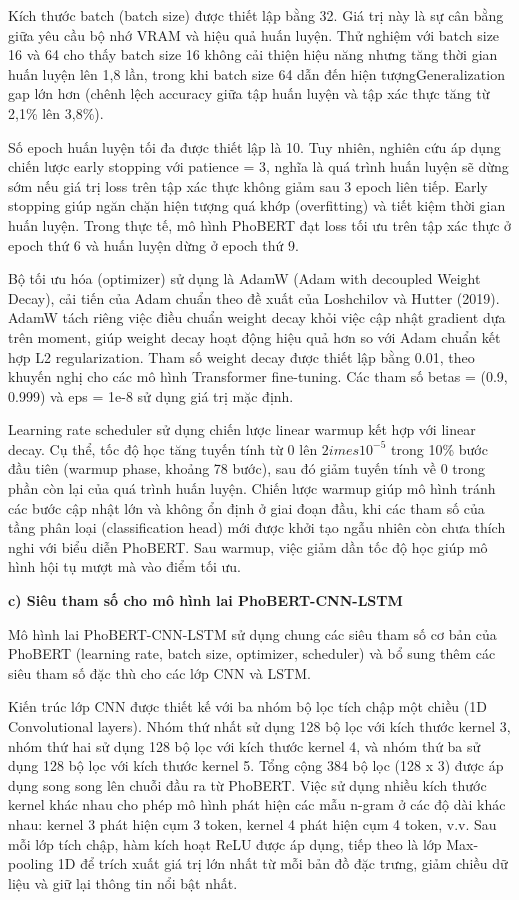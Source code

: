 \documentclass[14pt, a4paper]{report}
\begin{document}
Kích thước batch (batch size) được thiết lập bằng 32. Giá trị này là sự cân bằng giữa yêu cầu bộ nhớ VRAM và hiệu quả huấn luyện. Thử nghiệm với batch size 16 và 64 cho thấy batch size 16 không cải thiện hiệu năng nhưng tăng thời gian huấn luyện lên 1,8 lần, trong khi batch size 64 dẫn đến hiện tượngGeneralization gap lớn hơn (chênh lệch accuracy giữa tập huấn luyện và tập xác thực tăng từ 2,1\% lên 3,8\%).


Số epoch huấn luyện tối đa được thiết lập là 10. Tuy nhiên, nghiên cứu áp dụng chiến lược early stopping với patience = 3, nghĩa là quá trình huấn luyện sẽ dừng sớm nếu giá trị loss trên tập xác thực không giảm sau 3 epoch liên tiếp. Early stopping giúp ngăn chặn hiện tượng quá khớp (overfitting) và tiết kiệm thời gian huấn luyện. Trong thực tế, mô hình PhoBERT đạt loss tối ưu trên tập xác thực ở epoch thứ 6 và huấn luyện dừng ở epoch thứ 9.


Bộ tối ưu hóa (optimizer) sử dụng là AdamW (Adam with decoupled Weight Decay), cải tiến của Adam chuẩn theo đề xuất của Loshchilov và Hutter (2019). AdamW tách riêng việc điều chuẩn weight decay khỏi việc cập nhật gradient dựa trên moment, giúp weight decay hoạt động hiệu quả hơn so với Adam chuẩn kết hợp L2 regularization. Tham số weight decay được thiết lập bằng 0.01, theo khuyến nghị cho các mô hình Transformer fine-tuning. Các tham số betas = (0.9, 0.999) và eps = 1e-8 sử dụng giá trị mặc định.


Learning rate scheduler sử dụng chiến lược linear warmup kết hợp với linear decay. Cụ thể, tốc độ học tăng tuyến tính từ 0 lên $2 	imes 10^{-5}$ trong 10\% bước đầu tiên (warmup phase, khoảng 78 bước), sau đó giảm tuyến tính về 0 trong phần còn lại của quá trình huấn luyện. Chiến lược warmup giúp mô hình tránh các bước cập nhật lớn và không ổn định ở giai đoạn đầu, khi các tham số của tầng phân loại (classification head) mới được khởi tạo ngẫu nhiên còn chưa thích nghi với biểu diễn PhoBERT. Sau warmup, việc giảm dần tốc độ học giúp mô hình hội tụ mượt mà vào điểm tối ưu.


\textbf{c) Siêu tham số cho mô hình lai PhoBERT-CNN-LSTM}


Mô hình lai PhoBERT-CNN-LSTM sử dụng chung các siêu tham số cơ bản của PhoBERT (learning rate, batch size, optimizer, scheduler) và bổ sung thêm các siêu tham số đặc thù cho các lớp CNN và LSTM.


Kiến trúc lớp CNN được thiết kế với ba nhóm bộ lọc tích chập một chiều (1D Convolutional layers). Nhóm thứ nhất sử dụng 128 bộ lọc với kích thước kernel 3, nhóm thứ hai sử dụng 128 bộ lọc với kích thước kernel 4, và nhóm thứ ba sử dụng 128 bộ lọc với kích thước kernel 5. Tổng cộng 384 bộ lọc (128 x 3) được áp dụng song song lên chuỗi đầu ra từ PhoBERT. Việc sử dụng nhiều kích thước kernel khác nhau cho phép mô hình phát hiện các mẫu n-gram ở các độ dài khác nhau: kernel 3 phát hiện cụm 3 token, kernel 4 phát hiện cụm 4 token, v.v. Sau mỗi lớp tích chập, hàm kích hoạt ReLU được áp dụng, tiếp theo là lớp Max-pooling 1D để trích xuất giá trị lớn nhất từ mỗi bản đồ đặc trưng, giảm chiều dữ liệu và giữ lại thông tin nổi bật nhất.
\end{document}
